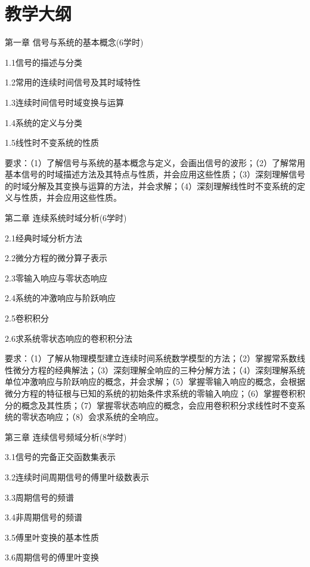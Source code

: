 \documentclass[letterpaper]{article}
\begin{document}
\section*{\textsc{教学大纲}}
第一章 \quad 信号与系统的基本概念(6学时)\par
\quad\quad 1.1信号的描述与分类\par
\quad\quad 1.2常用的连续时间信号及其时域特性\par
\quad\quad 1.3连续时间信号时域变换与运算\par
\quad\quad 1.4系统的定义与分类\par
\quad\quad 1.5线性时不变系统的性质\par
\quad\quad 要求：（1）了解信号与系统的基本概念与定义，会画出信号的波形；（2）了解常用基本信号的时域描述方法及其特点与性质，并会应用这些性质；（3）深刻理解信号的时域分解及其变换与运算的方法，并会求解；（4）深刻理解线性时不变系统的定义与性质，并会应用这些性质。\par
\vspace{1em}
第二章 \quad 连续系统时域分析(6学时)\par
\quad\quad 2.1经典时域分析方法\par
\quad\quad 2.2微分方程的微分算子表示\par
\quad\quad 2.3零输入响应与零状态响应\par
\quad\quad 2.4系统的冲激响应与阶跃响应\par
\quad\quad 2.5卷积积分\par
\quad\quad 2.6求系统零状态响应的卷积积分法\par
\quad\quad 要求：（1）了解从物理模型建立连续时间系统数学模型的方法；（2）掌握常系数线性微分方程的经典解法；（3）深刻理解全响应的三种分解方法；（4）深刻理解系统单位冲激响应与阶跃响应的概念，并会求解；（5）掌握零输入响应的概念，会根据微分方程的特征根与已知的系统的初始条件求系统的零输入响应；（6）掌握卷积积分的概念及其性质；（7）掌握零状态响应的概念，会应用卷积积分求线性时不变系统的零状态响应；（8）会求系统的全响应。\par
\vspace{1em}
第三章 \quad 连续信号频域分析(8学时)\par
\quad\quad 3.1信号的完备正交函数集表示\par
\quad\quad 3.2连续时间周期信号的傅里叶级数表示\par
\quad\quad 3.3周期信号的频谱\par
\quad\quad 3.4非周期信号的频谱\par
\quad\quad 3.5傅里叶变换的基本性质\par
\quad\quad 3.6周期信号的傅里叶变换\par
\end{document}
